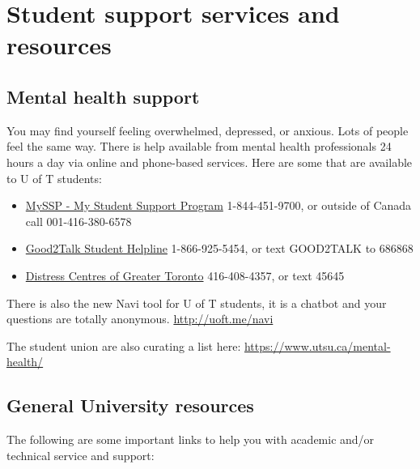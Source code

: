 \documentclass[
  openany]{book}
\begin{document}
\hypertarget{student-support-services-and-resources}{%
\section{Student support services and resources}\label{student-support-services-and-resources}}

\hypertarget{mental-health-support}{%
\subsection{Mental health support}\label{mental-health-support}}

You may find yourself feeling overwhelmed, depressed, or anxious. Lots of people feel the same way. There is help available from mental health professionals 24 hours a day via online and phone-based services. Here are some that are available to U of T students:

\begin{itemize}
\item
  \href{https://www.studentlife.utoronto.ca/hwc/myssp}{MySSP - My Student Support Program} 1-844-451-9700, or outside of Canada call 001-416-380-6578
\item
  \href{https://good2talk.ca/}{Good2Talk Student Helpline} 1-866-925-5454, or text GOOD2TALK to 686868
\item
  \href{https://www.torontodistresscentre.com/}{Distress Centres of Greater Toronto} 416-408-4357, or text 45645
\end{itemize}

There is also the new Navi tool for U of T students, it is a chatbot and your questions are totally anonymous. \url{http://uoft.me/navi}

The student union are also curating a list here: \url{https://www.utsu.ca/mental-health/}

\hypertarget{general-university-resources}{%
\subsection{General University resources}\label{general-university-resources}}

The following are some important links to help you with academic and/or technical service and support:
\end{document}
